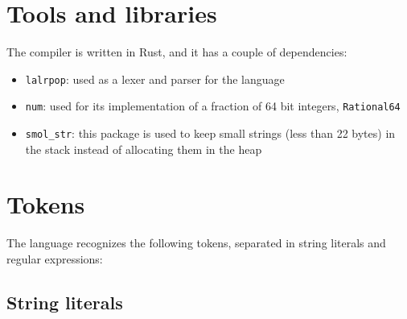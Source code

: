 \documentclass[11pt]{scrreprt}
\begin{document}
\section{Tools and libraries}
The compiler is written in Rust, and it has a couple of dependencies:
\begin{itemize}
  \item \texttt{lalrpop}: used as a lexer and parser for the language
  \item \texttt{num}: used for its implementation of a fraction of 64 bit integers, \texttt{Rational64}
  \item \texttt{smol\_str}: this package is used to keep small strings (less than 22 bytes) in the stack instead of allocating them in the heap
\end{itemize}

\section{Tokens}
The language recognizes the following tokens, separated in string literals and regular expressions:

\subsection{String literals}
\end{document}
